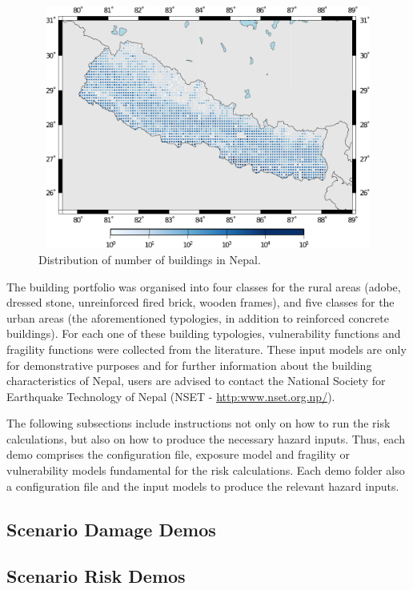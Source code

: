 \begin{figure}[ht]
\centering
\includegraphics[width=12cm,height=8cm]{figures/risk/NepalExposure.pdf}
\caption{Distribution of number of buildings in Nepal.}
\label{fig:expNepal}
\end{figure}

The building portfolio was organised into four classes for the rural areas
(adobe, dressed stone, unreinforced fired brick, wooden frames), and five
classes for the urban areas (the aforementioned typologies, in addition to
reinforced concrete buildings). For each one of these building typologies,
\glspl{vulnerability function} and \glspl{fragility function} were collected
from the literature. These input models are only for demonstrative purposes
and for further information about the building characteristics of Nepal, users
are advised to contact the National Society for Earthquake Technology of Nepal
(NSET - \href{http://www.nset.org.np/}{http:www.nset.org.np/}).

The following subsections include instructions not only on how to run the risk
calculations, but also on how to produce the necessary hazard inputs. Thus,
each demo comprises the configuration file, exposure model and fragility or
vulnerability models fundamental for the risk calculations. Each demo folder
also a configuration file and the input models to produce the relevant hazard
inputs.


\subsection{Scenario Damage Demos}
\label{subsec:demos_scenario_damage}


\subsection{Scenario Risk Demos}
\label{subsec:demos_scenario_risk}



